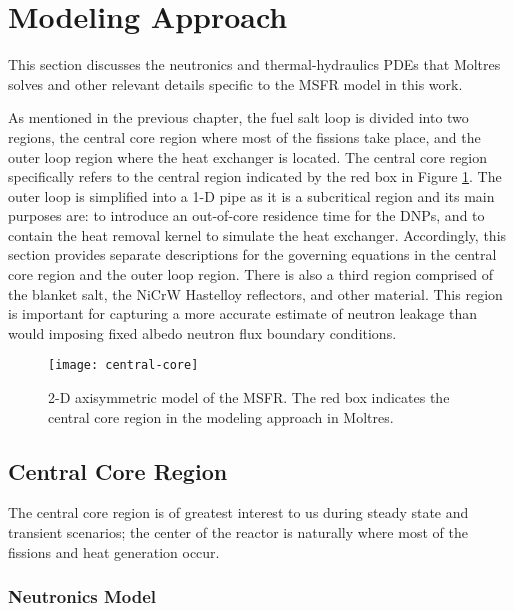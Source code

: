 \section{Modeling Approach}

This section discusses the neutronics and thermal-hydraulics
\glspl{PDE} that Moltres solves and other relevant details specific to the
\gls{MSFR} model in this work.

As mentioned in the previous chapter, the fuel salt loop is divided into two
regions, the central core region where most of the fissions take place, and
the outer loop region where the heat exchanger is located. The central core
region specifically refers to the central region indicated by
the red box in Figure \ref{fig:core}. The outer loop is simplified
into a 1-D pipe as it is a subcritical region and its main purposes are: to
introduce an out-of-core residence time for the \glspl{DNP}, and to contain
the heat removal kernel to simulate the heat exchanger.
Accordingly, this section provides separate descriptions for the governing
equations in the central core region and the outer loop region. There is also
a third region comprised of the blanket salt, the NiCrW Hastelloy reflectors, 
and other material. This region is important for capturing a more accurate
estimate of neutron leakage than would
imposing fixed albedo neutron flux boundary conditions.

\begin{figure}[htb!]
    \centering
    \texttt{[image: central-core]}
    \caption{2-D axisymmetric model of the MSFR. The red box indicates the
    central core region in the modeling approach in Moltres.}
    \label{fig:core}
\end{figure}

\subsection{Central Core Region}

The central core region is of greatest interest to us during steady state and
transient scenarios; the center of the reactor is naturally where most of the
fissions and heat generation occur.

\subsubsection{Neutronics Model}

